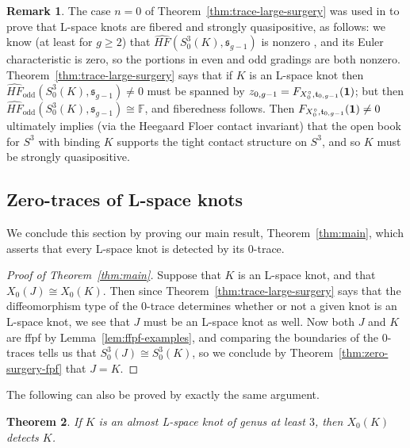 \documentclass[11pt]{amsart}
\newtheorem {theorem}{Theorem}
\numberwithin{equation}{section}
\numberwithin{theorem}{section}
\theoremstyle{definition}
\newtheorem{remark}[theorem]{Remark}
\newcommand{\F}{\mathbb{F}}
\newcommand{\spinc}{\mathfrak{s}}
\newcommand{\spint}{\mathfrak{t}}
\newcommand{\hfhat}{\widehat{\mathit{HF}}}
\newcommand{\godd}{\mathrm{odd}}
\begin{document}
\begin{remark}
The case $n=0$ of Theorem~\ref{thm:trace-large-surgery} was used in \cite{bs-fibered-sqp} to prove that L-space knots are fibered and strongly quasipositive, as follows: we know (at least for $g\geq2$) that $\hfhat(S^3_0(K),\spinc_{g-1})$ is nonzero \cite{osz-genus}, and its Euler characteristic is zero, so the portions in even and odd gradings are both nonzero.  Theorem~\ref{thm:trace-large-surgery} says that if $K$ is an L-space knot then $\hfhat_\godd(S^3_0(K),\spinc_{g-1}) \neq 0$ must be spanned by $z_{0,g-1}=F_{X^\circ_0,\spint_{0,g-1}}({\bf 1})$; but then $\hfhat_\godd(S^3_0(K),\spinc_{g-1}) \cong \F$, and fiberedness follows.  Then $F_{X^\circ_0,\spint_{0,g-1}}({\bf 1}) \neq 0$ ultimately implies (via the Heegaard Floer contact invariant) that the open book for $S^3$ with binding $K$ supports the tight contact structure on $S^3$, and so $K$ must be strongly quasipositive.
\end{remark}

%
%
%

\subsection{Zero-traces of L-space knots}

We conclude this section by proving our main result, Theorem~\ref{thm:main}, which asserts that every L-space knot is detected by its $0$-trace. 

\begin{proof}[Proof of Theorem~\ref{thm:main}]
Suppose that $K$ is an L-space knot, and that $X_0(J) \cong X_0(K)$.  Then since Theorem~\ref{thm:trace-large-surgery} says that the diffeomorphism type of the 0-trace determines whether or not a given knot is an L-space knot, we see that $J$ must be an L-space knot as well.  Now both $J$ and $K$ are ffpf by Lemma~\ref{lem:ffpf-examples}, and comparing the boundaries of the $0$-traces tells us that $S^3_0(J) \cong S^3_0(K)$, so we conclude by Theorem~\ref{thm:zero-surgery-fpf} that $J=K$.
\end{proof}

The following can also be proved by exactly the same argument.

\begin{theorem} \label{thm:almost-l-space-zero}
If $K$ is an almost L-space knot of genus at least $3$, then $X_0(K)$ detects $K$.
\end{theorem}

%
%
%
%
%
\end{document}
